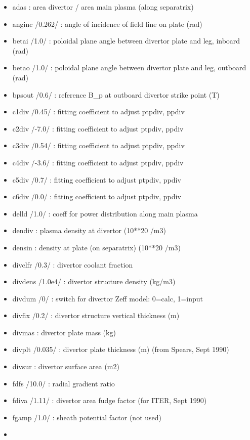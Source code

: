 \documentclass[]{article}
\providecommand{\tightlist}{%
  \setlength{\itemsep}{0pt}\setlength{\parskip}{0pt}}
\begin{document}
\begin{itemize}
\tightlist
\item
  adas : area divertor / area main plasma (along separatrix)
\item
  anginc /0.262/ : angle of incidence of field line on plate (rad)
\item
  betai /1.0/ : poloidal plane angle between divertor plate and leg,
  inboard (rad)
\item
  betao /1.0/ : poloidal plane angle between divertor plate and leg,
  outboard (rad)
\item
  bpsout /0.6/ : reference B\_p at outboard divertor strike point (T)
\item
  c1div /0.45/ : fitting coefficient to adjust ptpdiv, ppdiv
\item
  c2div /-7.0/ : fitting coefficient to adjust ptpdiv, ppdiv
\item
  c3div /0.54/ : fitting coefficient to adjust ptpdiv, ppdiv
\item
  c4div /-3.6/ : fitting coefficient to adjust ptpdiv, ppdiv
\item
  c5div /0.7/ : fitting coefficient to adjust ptpdiv, ppdiv
\item
  c6div /0.0/ : fitting coefficient to adjust ptpdiv, ppdiv
\item
  delld /1.0/ : coeff for power distribution along main plasma
\item
  dendiv : plasma density at divertor (10**20 /m3)
\item
  densin : density at plate (on separatrix) (10**20 /m3)
\item
  divclfr /0.3/ : divertor coolant fraction
\item
  divdens /1.0e4/ : divertor structure density (kg/m3)
\item
  divdum /0/ : switch for divertor Zeff model: 0=calc, 1=input
\item
  divfix /0.2/ : divertor structure vertical thickness (m)
\item
  divmas : divertor plate mass (kg)
\item
  divplt /0.035/ : divertor plate thickness (m) (from Spears, Sept 1990)
\item
  divsur : divertor surface area (m2)
\item
  fdfs /10.0/ : radial gradient ratio
\item
  fdiva /1.11/ : divertor area fudge factor (for ITER, Sept 1990)
\item
  fgamp /1.0/ : sheath potential factor (not used)
\item

\end{itemize}
\end{document}
